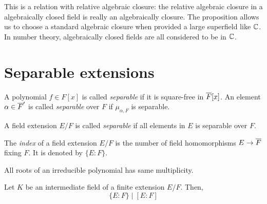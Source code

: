\documentclass{../exp}
\begin{document}
\begin{rd}
This is a relation with relative algebraic closure: the relative algebraic closure in a algebraically closed field is really an algebraically closure.
The proposition allows us to choose a standard algebraic closure when provided a large superfield like $\mathbb{C}$.
In number theory, algebraically closed fields are all considered to be in $\mathbb{C}$. 





























\section{Separable extensions}



\begin{defn}
A polynomial $f\in F[x]$ is called \emph{separable} if it is square-free in $\overline F[x]$.
An element $\alpha\in\overline F'$ is called \emph{separable} over $F$ if $\mu_{\alpha,F}$ is separable.
\end{defn}

\begin{defn}
A field extension $E/F$ is called \emph{separable} if all elements in $E$ is separable over $F$.
\end{defn}




\begin{defn}
The \emph{index} of a field extension $E/F$ is the number of field homomorphisms $E\to\cl F$ fixing $F$.
It is denoted by $\{E:F\}$.
\end{defn}

\begin{prop}
All roots of an irreducible polynomial has same multiplicity.
\end{prop}
\begin{pf}
\end{pf}

\begin{thm}
Let $K$ be an intermediate field of a finite extension $E/F$.
Then,
\[\{E:F\}\mid[E:F]\]
\end{thm}
\begin{pf}
\end{pf}






\end{rd}
\end{document}
